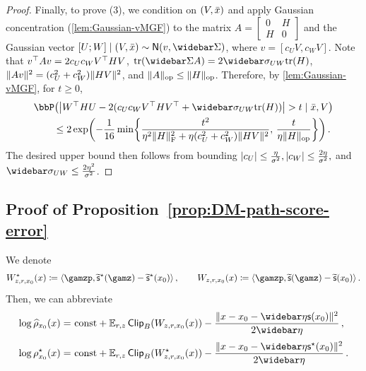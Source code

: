 \begin{proof}
Finally, to prove (3), we condition on $(V,\bar{x})$ and apply Gaussian concentration (\cref{lem:Gaussian-vMGF}) to the matrix $A=\begin{bmatrix}
    0 & H \\
    H & 0
\end{bmatrix}$ and the Gaussian vector $[U;W]\mid (V,\xbar)\sim \normal{v, \Sigbar}$, where $v=[c_UV,c_WV]$. Note that $v^\top Av=2c_Uc_WV^\top HV$, $\tr(\Sigbar A)=2\sigbar_{UW}\tr(H)$, $\lVert Av\rVert^2=(c_U^2+c_W^2)\lVert HV\rVert^2$, and $\lVert A\|_{\mathrm{op}}\leq \lVert H\|_{\mathrm{op}}$. Therefore, by \cref{lem:Gaussian-vMGF},
for $t\geq 0$,
\begin{align*}
    \MoveEqLeft \bbP\prn*{ \abs*{W\tp H U-2(c_Uc_W V\tp HV\tp+\siguw \tr(H))}>t \mid \xbar, V} \\
    &\leq 2\exp\prn*{-\frac{1}{16}\min\crl*{\frac{t^2}{\eta^2\nrmF{H}^2+\eta (c_U^2+c_W^2)\nrm{HV}^2},\, \frac{t}{\eta\nrmop{H}}}}\,.
\end{align*}
The desired upper bound then follows from bounding $\lvert c_U\rvert\leq \frac{\eta}{\sigma^2}, \lvert c_W\rvert\leq \frac{2\eta}{\sigma^2},$ and $\sigbar_{UW}\leq \frac{2\eta^2}{\sigma^2}$.
\end{proof}


\subsection{Proof of Proposition~\ref{prop:DM-path-score-error}}\label{appdx:pf-DM-path-score-error}


We denote
\begin{align}\label{eq:def-epsxz-star}
\begin{aligned}
    \epsxz\deq\tri{\gamzp,\tscfs(\gamz)-\tscfs(\xz)}\,, \qquad
    \epxz\deq\tri{\gamzp,\tscf(\gamz)-\tscf(\xz)}\,.
\end{aligned}
\end{align}
Then, we can abbreviate
\begin{align*}
    \log \rhohz{x}=&~\const+\En_{\lr,z}\pclip[\B]{\epxz}-\frac{\nrm{x-\xz-\etabar\scf(\xz)}^2}{2\etabar}\,, \\[0.25em]
    \log \rhosz{x}=&~\const+\En_{\lr,z}\pclip[\B]{\epsxz}-\frac{\nrm{x-\xz-\etabar\scfs(\xz)}^2}{2\etabar}\,.
\end{align*}

